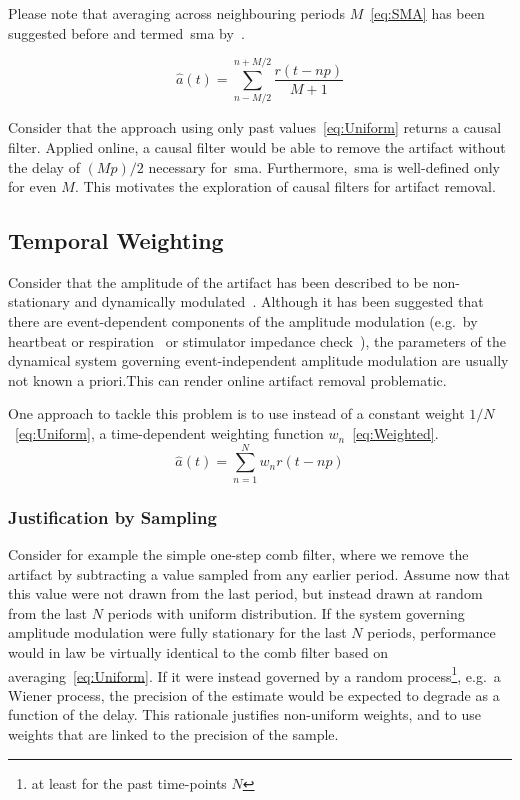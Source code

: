 \documentclass[a4paper]{article}
\begin{document}
Please note that averaging across neighbouring periods $M$~\eqref{eq:SMA} has been suggested before and termed~\gls{sma} by~\cite{Kohli_2015}.

\begin{equation}
    \hat{a}(t) = \sum_{n-M/2}^{n+M/2} \frac{r(t - np)}{M+1}\label{eq:SMA}
\end{equation}

Consider that the approach using only past values~\eqref{eq:Uniform} returns a causal filter. Applied online, a causal filter would be able to remove the artifact without the delay of $(Mp)/2$ necessary for~\gls{sma}. Furthermore,~\gls{sma} is well-defined only for even $M$. This motivates the exploration of causal filters for artifact removal.

\subsection{Temporal Weighting}

Consider that the amplitude of the  artifact has been described to be non-stationary and dynamically modulated~\citep{Noury_2016,Neuling_2017}.
Although it has been suggested that there are event-dependent components of the amplitude modulation (e.g.\ by heartbeat or respiration~\cite{Noury_2016} or stimulator impedance check~\cite{Neuling_2017}), the parameters of the dynamical system governing event-independent amplitude modulation are usually not known a priori.This can render online artifact removal problematic.

One approach to tackle this problem is to use instead of a constant weight $1/N$~\eqref{eq:Uniform}, a time-dependent weighting function $w_n$~\eqref{eq:Weighted}.
\begin{equation}
    \hat{a}(t) = \sum_{n=1}^{N} w_n r(t - np)\label{eq:Weighted}
\end{equation}

\subsubsection{Justification by Sampling}
Consider for example the simple one-step comb filter, where we remove the artifact by subtracting a value sampled from any earlier period.
Assume now that this value were not drawn from the last period, but instead drawn at random from the last $N$ periods with uniform distribution. If the system governing amplitude modulation were fully stationary for the last $N$ periods, performance would in law be virtually identical to the comb filter based on averaging~\eqref{eq:Uniform}.
If it were instead governed by a random process\footnote{at least for the past time-points $N$}, e.g.\ a Wiener process, the precision of the estimate would be expected to degrade as a function of the delay. This rationale justifies non-uniform weights, and to use weights that are linked to the precision of the sample.
\end{document}
